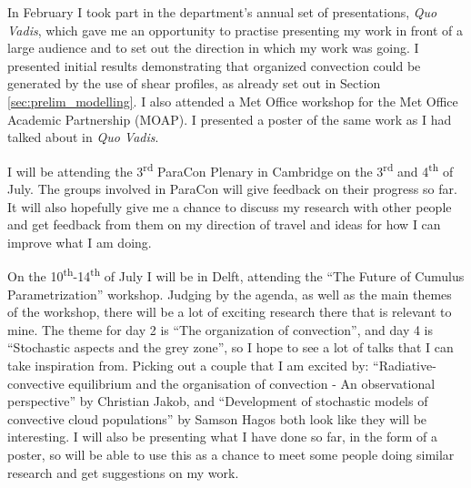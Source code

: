 \documentclass[11pt,a4paper]{article}
\newcommand{\ts}{\textsuperscript}
\begin{document}
In February I took part in the department's annual set of presentations, \textit{Quo Vadis}, which gave me an opportunity to practise presenting my work in front of a large audience and to set out the direction in which my work was going. I presented initial results demonstrating that organized convection could be generated by the use of shear profiles, as already set out in Section \ref{sec:prelim_modelling}. I also attended a Met Office workshop for the Met Office Academic Partnership (MOAP). I presented a poster of the same work as I had talked about in \textit{Quo Vadis}.

I will be attending the 3\ts{rd} ParaCon Plenary in Cambridge on the 3\ts{rd} and 4\ts{th} of July. The groups involved in ParaCon will give feedback on their progress so far. It will also hopefully give me a chance to discuss my research with other people and get feedback from them on my direction of travel and ideas for how I can improve what I am doing.

On the 10\ts{th}-14\ts{th} of July I will be in Delft, attending the ``The Future of Cumulus Parametrization'' workshop. Judging by the agenda, as well as the main themes of the workshop, there will be a lot of exciting research there that is relevant to mine. The theme for day 2 is ``The organization of convection'', and day 4 is ``Stochastic aspects and the grey zone'', so I hope to see a lot of talks that I can take inspiration from. Picking out a couple that I am excited by: ``Radiative-convective equilibrium and the organisation of convection - An observational perspective'' by Christian Jakob, and ``Development of stochastic models of convective cloud populations'' by Samson Hagos both look like they will be interesting. I will also be presenting what I have done so far, in the form of a poster, so will be able to use this as a chance to meet some people doing similar research and get suggestions on my work.
\end{document}
